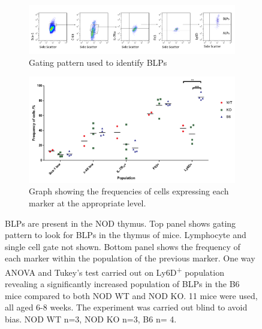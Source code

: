 


\begin{figure}
	\begin{subfigure}{\textwidth}
	\includegraphics[width=\textwidth]{Figures/BLPgating.png}
	\caption{Gating pattern used to identify BLPs}
	\label{subfig:BLPgating}
	\end{subfigure}
	\begin{subfigure}{\textwidth}
	\includegraphics[width=\textwidth]{Figures/ProgenitorMarkers.pdf}
	\caption{Graph showing the frequencies of cells expressing each marker at the appropriate level.}
	\label{subfig:BLPgraph}
	\end{subfigure}
\caption[BLPs are significantly decreased in the NOD thymus compared to the B6 thymus]{BLPs are present in the NOD thymus. 
Top panel shows gating pattern to look for BLPs in the thymus of mice. Lymphocyte and single cell gate not shown.
Bottom panel shows the frequency of each marker within the population of the previous marker.
One way ANOVA and Tukey's test carried out on Ly6D\textsuperscript{+} population revealing a significantly increased population of BLPs in the B6 mice compared to both NOD WT and NOD KO.
11 mice were used, all aged 6-8 weeks. 
The experiment was carried out blind to avoid bias. 
NOD WT n=3, NOD KO n=3, B6 n= 4.}
\label{fig:BLPs}
\end{figure}

